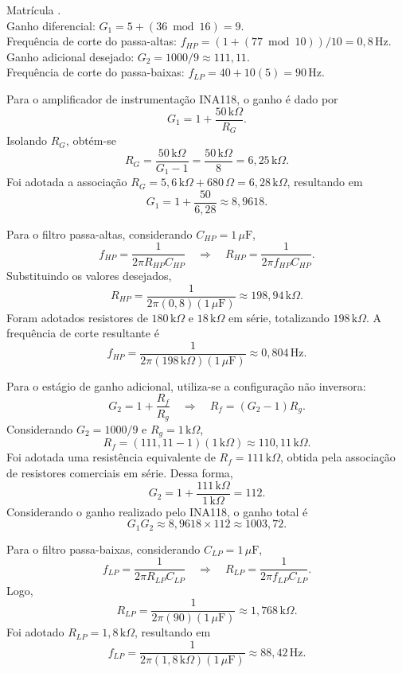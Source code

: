 \documentclass[11pt,a4paper]{article}
\begin{document}
\begin{espec}
Matrícula . \\
Ganho diferencial: \(G_1=5+(36\bmod 16)=9\). \\
Frequência de corte do passa-altas: \(f_{HP}=(1+(77\bmod 10))/10=0{,}8\,\text{Hz}\). \\
Ganho adicional desejado: \(G_2=1000/9\approx111{,}11\). \\
Frequência de corte do passa-baixas: \(f_{LP}=40+10(5)=90\,\text{Hz}\).
\end{espec}

Para o amplificador de instrumentação INA118, o ganho é dado por
\[
G_1=1+\frac{50\,\text{k}\Omega}{R_G}.
\]
Isolando \(R_G\), obtém-se
\[
R_G=\frac{50\,\text{k}\Omega}{G_1-1}
=\frac{50\,\text{k}\Omega}{8}
=6{,}25\,\text{k}\Omega.
\]
Foi adotada a associação \(R_G=5{,}6\,\text{k}\Omega+680\,\Omega
=6{,}28\,\text{k}\Omega\), resultando em
\[
G_1=1+\frac{50}{6{,}28}\approx8{,}9618.
\]

Para o filtro passa-altas, considerando \(C_{HP}=1\,\mu\text{F}\),
\[
f_{HP}=\frac{1}{2\pi R_{HP}C_{HP}}
\quad\Rightarrow\quad
R_{HP}=\frac{1}{2\pi f_{HP}C_{HP}}.
\]
Substituindo os valores desejados,
\[
R_{HP}=\frac{1}{2\pi(0{,}8)(1\,\mu\text{F})}
\approx198{,}94\,\text{k}\Omega.
\]
Foram adotados resistores de \(180\,\text{k}\Omega\) e
\(18\,\text{k}\Omega\) em série, totalizando \(198\,\text{k}\Omega\).
A frequência de corte resultante é
\[
f_{HP}=\frac{1}{2\pi(198\,\text{k}\Omega)(1\,\mu\text{F})}
\approx0{,}804\,\text{Hz}.
\]

Para o estágio de ganho adicional, utiliza-se a configuração não inversora:
\[
G_2=1+\frac{R_f}{R_g}
\quad\Rightarrow\quad
R_f=(G_2-1)R_g.
\]
Considerando \(G_2=1000/9\) e \(R_g=1\,\text{k}\Omega\),
\[
R_f=(111{,}11-1)(1\,\text{k}\Omega)
\approx110{,}11\,\text{k}\Omega.
\]
Foi adotada uma resistência equivalente de
\(R_f=111\,\text{k}\Omega\), obtida pela associação de
resistores comerciais em série. Dessa forma,
\[
G_2=1+\frac{111\,\text{k}\Omega}{1\,\text{k}\Omega}=112.
\]
Considerando o ganho realizado pelo INA118, o ganho total é
\[
G_1G_2\approx8{,}9618\times112\approx1003{,}72.
\]

Para o filtro passa-baixas, considerando \(C_{LP}=1\,\mu\text{F}\),
\[
f_{LP}=\frac{1}{2\pi R_{LP}C_{LP}}
\quad\Rightarrow\quad
R_{LP}=\frac{1}{2\pi f_{LP}C_{LP}}.
\]
Logo,
\[
R_{LP}=\frac{1}{2\pi(90)(1\,\mu\text{F})}
\approx1{,}768\,\text{k}\Omega.
\]
Foi adotado \(R_{LP}=1{,}8\,\text{k}\Omega\), resultando em
\[
f_{LP}=\frac{1}{2\pi(1{,}8\,\text{k}\Omega)(1\,\mu\text{F})}
\approx88{,}42\,\text{Hz}.
\]
\end{document}
